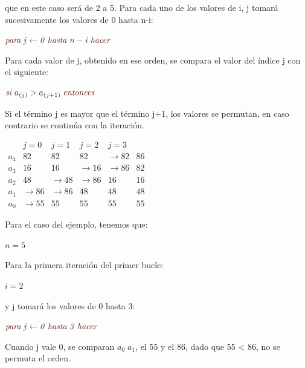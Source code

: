 \documentclass[8pt, A4]{article}    %
\newcommand\tab[1][1cm]{\hspace*{#1}}
\begin{document}
que en este caso será de 2 a 5. Para cada uno de los valores de i, j tomará sucesivamente los valores de 0 hasta n-i:

\tab ${\displaystyle {\color {Sepia}{\mathit {para}}}\;{\color {Black}{\mathit {j}}}\;{\color {BlueViolet}{\mathit {\gets }}}\;{\color {Black}{\mathit {0}}}\;{\color {Sepia}{\mathit {hasta}}}\;{\color {Black}{\mathit {n-i}}}\;{\color {Sepia}{\mathit {hacer}}}}$

Para cada valor de j, obtenido en ese orden, se compara el valor del índice j con el siguiente:

\tab ${\displaystyle {\color {Sepia}{\mathit {si}}}\;{\color {Black}a_{(j)}}\;{\color {BlueViolet}>}\;{\color {Black}a_{(j+1)}}\;{\color {Sepia}{\mathit {entonces}}}}$

Si el término j es mayor que el término j+1, los valores se permutan, en caso contrario se continúa con la iteración.

\begin{table}[h]
\centering
$\begin{array}{r||r|r|r|r|r}
            & j =  0 & j =  1 & j =  2 & j =  3 &    \\
      \hline
      a_{4} &     82 &     82 &     82 & \to 82 & 86 \\
      a_{3} &     16 &     16 & \to 16 & \to 86 & 82 \\
      a_{2} &     48 & \to 48 & \to 86 &     16 & 16 \\
      a_{1} & \to 86 & \to 86 &     48 &     48 & 48 \\
      a_{0} & \to 55 &     55 &     55 &     55 & 55
\end{array}$
\end{table}

Para el caso del ejemplo, tenemos que:

\tab ${\displaystyle n=5\,}$

Para la primera iteración del primer bucle:

\tab ${\displaystyle i=2\,}$

y j tomará los valores de 0 hasta 3:

\tab ${\displaystyle {\color {Sepia}{\mathit {para}}}\;{\color {Black}{\mathit {j}}}\;{\color {BlueViolet}{\mathit {\gets }}}\;{\color {Black}{\mathit {0}}}\;{\color {Sepia}{\mathit {hasta}}}\;{\color {Black}{\mathit {3}}}\;{\color {Sepia}{\mathit {hacer}}}}$

Cuando j vale 0, se comparan ${\displaystyle a_{0}\;a_{1}}$, el 55 y el 86, dado que 55 < 86, no se permuta el orden.
\end{document}
